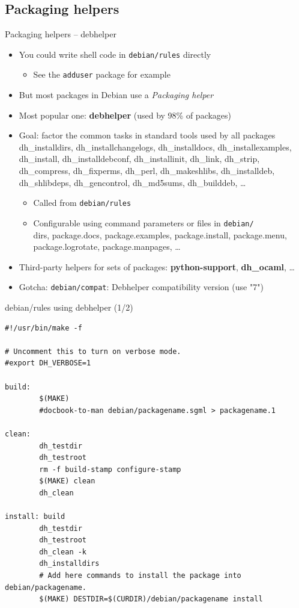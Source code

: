 \documentclass[10pt,final]{beamer}
\begin{document}
\subsection{Packaging helpers}
\begin{frame}{Packaging helpers -- debhelper}
\begin{itemize}
	\item You could write shell code in \texttt{debian/rules} directly
	\begin{itemize}
		\item See the \texttt{adduser} package for example
	\end{itemize}
	\hbr
	\item But most packages in Debian use a \textsl{Packaging helper}
	\hbr
	\item Most popular one: \textbf{debhelper} (used by 98\% of packages)
	\hbr
	\item Goal: factor the common tasks in standard tools used by all packages\\
		{\footnotesize dh\_installdirs, dh\_installchangelogs, dh\_installdocs, dh\_installexamples, dh\_install, dh\_installdebconf, dh\_installinit, dh\_link, dh\_strip, dh\_compress, dh\_fixperms, dh\_perl, dh\_makeshlibs, dh\_installdeb, dh\_shlibdeps, dh\_gencontrol, dh\_md5sums, dh\_builddeb, \ldots}
		\begin{itemize}
			\item Called from \texttt{debian/rules}
			\item Configurable using command parameters or files in \texttt{debian/}\\
				{\footnotesize \ttfamily dirs, package.docs, package.examples, package.install, package.menu, package.logrotate, package.manpages, \ldots}
		\end{itemize}
	\hbr
\item Third-party helpers for sets of packages: \textbf{python-support}, \textbf{dh\_ocaml}, \ldots
	\hbr
\item Gotcha: \texttt{debian/compat}: Debhelper compatibility version (use "7")
\end{itemize}
\end{frame}

\begin{frame}[fragile]{debian/rules using debhelper (1/2)}
\begin{lstlisting}[basicstyle=\ttfamily\footnotesize]
#!/usr/bin/make -f

# Uncomment this to turn on verbose mode.
#export DH_VERBOSE=1

build: 
        $(MAKE)
        #docbook-to-man debian/packagename.sgml > packagename.1

clean: 
        dh_testdir
        dh_testroot
        rm -f build-stamp configure-stamp
        $(MAKE) clean
        dh_clean 

install: build
        dh_testdir
        dh_testroot
        dh_clean -k 
        dh_installdirs
        # Add here commands to install the package into debian/packagename.
        $(MAKE) DESTDIR=$(CURDIR)/debian/packagename install
\end{lstlisting}
\end{frame}
\end{document}
